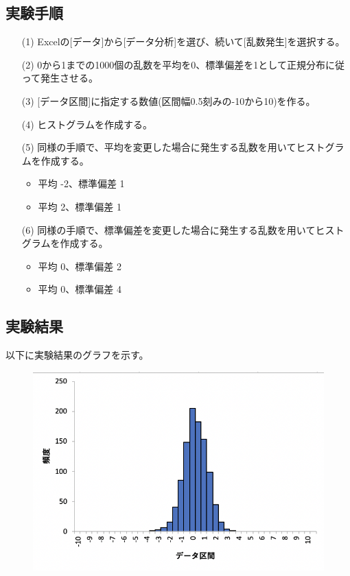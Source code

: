 \documentclass[12pt]{jarticle}
\begin{document}
\subsection{実験手順}
\begin{itemize}
    \item[(1)] Excelの[データ]から[データ分析]を選び、続いて[乱数発生]を選択する。
    \item[(2)] 0から1までの1000個の乱数を平均を0、標準偏差を1として正規分布に従って発生させる。
    \item[(3)] [データ区間]に指定する数値(区間幅0.5刻みの-10から10)を作る。
    \item[(4)] ヒストグラムを作成する。
    \item[(5)] 同様の手順で、平均を変更した場合に発生する乱数を用いてヒストグラムを作成する。
          \begin{itemize}
              \item 平均 -2、標準偏差 1
              \item 平均 2、標準偏差 1
          \end{itemize}
    \item[(6)] 同様の手順で、標準偏差を変更した場合に発生する乱数を用いてヒストグラムを作成する。
          \begin{itemize}
              \item 平均 0、標準偏差 2
              \item 平均 0、標準偏差 4
          \end{itemize}
\end{itemize}

\subsection{実験結果}
以下に実験結果のグラフを示す。

\begin{figure}[h]
    \begin{center}
        \includegraphics[scale=0.6]{kadai4_3graph1.png}
    \end{center}
    \caption{}
\end{figure}
\end{document}
